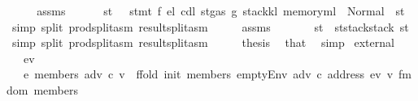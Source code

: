 \begin{isabellebody}
\ \ \isamarkupfalse%
\ \isamarkupfalse%
\ assms\ {}\ {}\ {}\ {}\ \isamarkupfalse%
\ st{\isacharprime}{\kern0pt}{\isacharprime}{\kern0pt}\ \ {}{\isacharcolon}{\kern0pt}\ {\isachardoublequoteopen}stmt\ f\ e\isactrlsub l\ cd\isactrlsub l\ {\isacharparenleft}{\kern0pt}st{\isasymlparr}gas{\isacharcolon}{\kern0pt}{\isacharequal}{\kern0pt}\ g{\isacharcomma}{\kern0pt}\ stack{\isacharcolon}{\kern0pt}{\isacharequal}{\kern0pt}k\isactrlsub l{\isacharcomma}{\kern0pt}\ memory{\isacharcolon}{\kern0pt}{\isacharequal}{\kern0pt}m\isactrlsub l{\isasymrparr}{\isacharparenright}{\kern0pt}\ {\isacharequal}{\kern0pt}\ Normal\ {\isacharparenleft}{\kern0pt}{\isacharparenleft}{\kern0pt}{\isacharparenright}{\kern0pt}{\isacharcomma}{\kern0pt}\ st{\isacharprime}{\kern0pt}{\isacharprime}{\kern0pt}{\isacharparenright}{\kern0pt}{\isachardoublequoteclose}\ \isamarkupfalse%
\ {\isacharparenleft}{\kern0pt}simp\ split{\isacharcolon}{\kern0pt}\ prod{\isachardot}{\kern0pt}split{\isacharunderscore}{\kern0pt}asm\ result{\isachardot}{\kern0pt}split{\isacharunderscore}{\kern0pt}asm{\isacharparenright}{\kern0pt}\isanewline
\ \ \isamarkupfalse%
\ \isamarkupfalse%
\ assms\ {}\ {}\ {}\ {}\ {}\ \isamarkupfalse%
\ {\isachardoublequoteopen}st{\isacharprime}{\kern0pt}\ {\isacharequal}{\kern0pt}\ st{\isacharprime}{\kern0pt}{\isacharprime}{\kern0pt}{\isasymlparr}stack{\isacharcolon}{\kern0pt}{\isacharequal}{\kern0pt}stack\ st{\isasymrparr}{\isachardoublequoteclose}\ \isamarkupfalse%
\ {\isacharparenleft}{\kern0pt}simp\ split{\isacharcolon}{\kern0pt}\ prod{\isachardot}{\kern0pt}split{\isacharunderscore}{\kern0pt}asm\ result{\isachardot}{\kern0pt}split{\isacharunderscore}{\kern0pt}asm{\isacharparenright}{\kern0pt}\isanewline
\ \ \isamarkupfalse%
\ \isamarkupfalse%
\ {\isacharquery}{\kern0pt}thesis\ \isamarkupfalse%
\ that\ \isamarkupfalse%
\ simp\isanewline
{}\isamarkupfalse%
%
\endisatagproof
{\isafoldproof}%
%
\isadelimproof
\isanewline
%
\endisadelimproof
\isanewline
{}\isamarkupfalse%
\ external{\isacharcolon}{\kern0pt}\isanewline
\ \ \ ev\isanewline
\ \ \ {\isachardoublequoteopen}e{\isacharprime}{\kern0pt}\ members\ adv\ c\ v\ {\isasymequiv}\ ffold\ {\isacharparenleft}{\kern0pt}init\ members{\isacharparenright}{\kern0pt}\ {\isacharparenleft}{\kern0pt}emptyEnv\ adv\ c\ {\isacharparenleft}{\kern0pt}address\ ev{\isacharparenright}{\kern0pt}\ v{\isacharparenright}{\kern0pt}\ {\isacharparenleft}{\kern0pt}fmdom\ members{\isacharparenright}{\kern0pt}{\isachardoublequoteclose}\isanewline

\end{isabellebody}
